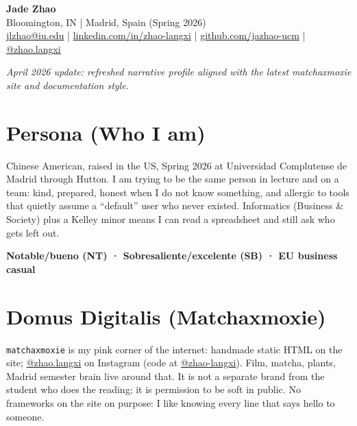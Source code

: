 \documentclass[11pt]{article}
\begin{document}
\begin{center}
    {\LARGE \textbf{Jade Zhao}}\\
    \vspace{0.25em}
    {\small Bloomington, IN \;|\; Madrid, Spain (Spring 2026)}\\
    \vspace{0.25em}
    {\small
      \href{mailto:jlzhao@iu.edu}{jlzhao@iu.edu}
      \;|\;
      \href{https://www.linkedin.com/in/zhao-langxi/}{linkedin.com/in/zhao-langxi}
      \;|\;
      \href{https://github.com/jazhao-ucm}{github.com/jazhao-ucm}
      \;|\;
      \href{https://instagram.com/zhao.langxi}{@zhao.langxi}
    }
    \vspace{0.25em}
\end{center}

\noindent\textit{April 2026 update: refreshed narrative profile aligned with the latest matchaxmoxie site and documentation style.}

\vspace{0.75em}

\section*{Persona (Who I am)}
Chinese American, raised in the US, Spring 2026 at Universidad Complutense de Madrid through Hutton. I am trying to be the same person in lecture and on a team: kind, prepared, honest when I do not know something, and allergic to tools that quietly assume a ``default'' user who never existed. Informatics (Business \& Society) plus a Kelley minor means I can read a spreadsheet and still ask who gets left out.

{\bfseries Notable/bueno (NT) · Sobresaliente/excelente (SB) · EU business casual}

\section*{Domus Digitalis (Matchaxmoxie)}
\texttt{matchaxmoxie} is my pink corner of the internet: handmade static HTML on the site; \href{https://instagram.com/zhao.langxi}{@zhao.langxi} on Instagram (code at \href{https://github.com/zhao-langxi}{@zhao-langxi}). Film, matcha, plants, Madrid semester brain live around that. It is not a separate brand from the student who does the reading; it is permission to be soft in public. No frameworks on the site on purpose: I like knowing every line that says hello to someone.
\end{document}
